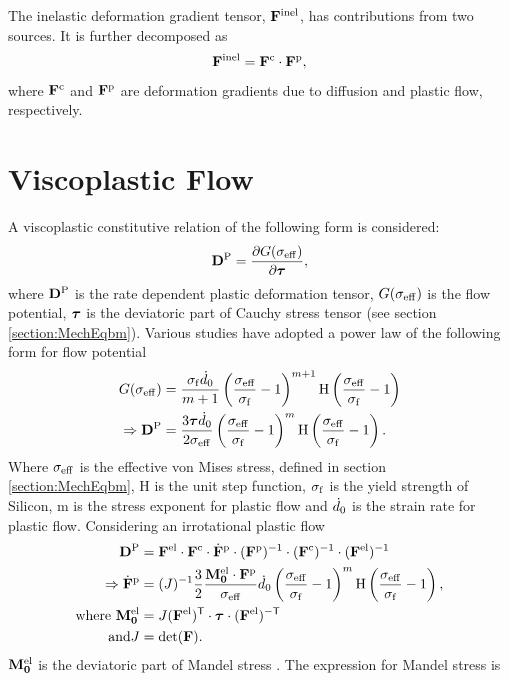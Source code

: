 The inelastic deformation gradient tensor, $\mathbf{F}^{{\rm{inel}}}$, has contributions from two sources. It is further decomposed as 
\begin{gather}
    \mathbf{F}^{\rm{inel}} = \mathbf{F}^{\rm{c}} \cdot \mathbf{F}^{\rm{p}}, \label{eq:Finel_decomposition}
\end{gather}where $\mathbf{F}^{\rm{c}}$ and $\mathbf{F}^{\rm{p}}$ are deformation gradients due to diffusion and plastic flow, respectively.

\section{Viscoplastic Flow}
A viscoplastic constitutive relation of the following form is considered:
\begin{gather}
\mathbf{D}^{\rm{P}} = \frac{\partial G(\sigma_{\rm{eff}})}{\partial \bm{\tau}},
\end{gather}
where $\mathbf{D}^{\rm{P}}$ is the rate dependent plastic deformation tensor, $G(\sigma_{\rm{eff}})$ is the flow potential, $\bm{\tau}$ is the deviatoric part of Cauchy stress tensor (see section \ref{section:MechEqbm}).
Various studies \citep{2011JMPSBower,2012JMPSCui} have adopted a power law of the following form for flow potential
\begin{align}
G(\sigma_{\rm{eff}}) &= \frac{\sigma_{\rm{f}} {\dot{d}}_0}{m+1}\left(\frac{\sigma_{\rm{eff}}}{\sigma_{\rm{f}}}-1\right)^{m+1}\mathrm{H}\left( \frac{\sigma_{\rm{eff}}}{\sigma_{\rm{f}}} - 1\right) \\
\Rightarrow \mathbf{D}^{\rm{P}} &= \frac{3 \bm{\tau} {\dot{d}}_0}{2 \sigma_{\rm{eff}}}\left(\frac{\sigma_{\rm{eff}}}{\sigma_{\rm{f}}}-1\right)^{m}\mathrm{H}\left( \frac{\sigma_{\rm{eff}}}{\sigma_{\rm{f}}} - 1\right).
\end{align}
Where $\sigma_{\rm{eff}}$ is the effective von Mises stress, defined in section \ref{section:MechEqbm}, H is the unit step function, $\sigma_{\rm{f}}$ is the yield strength of Silicon, m is the stress exponent for plastic flow and ${\dot{d}}_0$ is the strain rate for plastic flow. Considering an irrotational plastic flow  \citep{2005JMPSGurtin, 2005IJPGurtin,2023IJSSAmit} 
\begin{align}
\mathbf{D}^{\rm{P}} &= \mathbf{F}^{{\rm{el}}} \cdot \mathbf{F}^{\rm{c}} \cdot \dot{\mathbf{F}}^{\rm{p}} \cdot (\mathbf{F}^{\rm{p}})^{-1} \cdot (\mathbf{F}^{\rm{c}})^{-1} \cdot (\mathbf{F}^{{\rm{el}}})^{-1}  \\
\Rightarrow \dot{\mathbf{F}}^{\rm{p}} &= (J)^{-1} \frac{3}{2} \frac{\mathbf{{M}_0^{{\rm{el}}}} \cdot \mathbf{F}^{\rm{p}}}{\sigma_{\rm{eff}}} {\dot{d}}_0 \left( \frac{\sigma_{\rm{eff}}}{\sigma_{\rm{f}}} - 1 \right)^m \mathrm{H}\left( \frac{\sigma_{\rm{eff}}}{\sigma_{\rm{f}}} - 1\right), \\
\text{where }\mathbf{{M}_0^{{\rm{el}}}} &= J (\mathbf{F}^{\rm{el}})^{\sf {T}} \cdot \bm{\tau} \cdot (\mathbf{F}^{\rm{el}})^{-\sf {T}} \label{eq:M_tensor} \\
\text{and} J &= \mathrm{det}(\mathbf{F}). 
\end{align}
$\mathbf{{M}_0^{{\rm{el}}}}$ is the deviatoric part of Mandel stress \citep{1971Mandel}. The expression for Mandel stress is 

